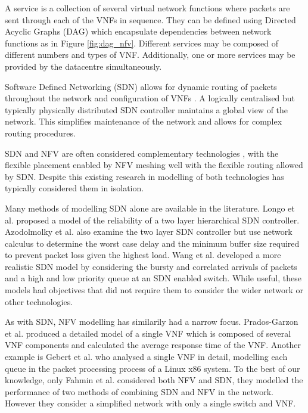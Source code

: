 A service is a collection of several virtual network functions where packets are sent through each of the VNFs in sequence. They can be defined using Directed Acyclic Graphs (DAG) which encapsulate dependencies between network functions as in Figure \ref{fig:dag_nfv}. Different services may be composed of different numbers and types of VNF. Additionally, one or more services may be provided by the datacentre simultaneously.

Software Defined Networking (SDN) allows for dynamic routing of packets throughout the network and configuration of VNFs \cite{KimF13, HaresW13}. A logically centralised but typically physically distributed SDN controller maintains a global view of the network. This simplifies maintenance of the network and allows for complex routing procedures. 

SDN and NFV are often considered complementary technologies \cite{MatiasGTUJ15}, with the flexible placement enabled by NFV meshing well with the flexible routing allowed by SDN. Despite this existing research in modelling of both technologies has typically considered them in isolation.

Many methods of modelling SDN alone are available in the literature. Longo et al. \cite{LongoDBS15} proposed a model of the reliability of a two layer hierarchical SDN controller. Azodolmolky et al. \cite{AzodolmolkyWY13} also examine the two layer SDN controller but use network calculus to determine the worst case delay and the minimum buffer size required to prevent packet loss given the highest load. Wang et al. \cite{MiaoMWWH16} developed a more realistic SDN model by considering the bursty and correlated arrivals of packets and a high and low priority queue at an SDN enabled switch. While useful, these models had objectives that did not require them to consider the wider network or other technologies.

As with SDN, NFV modelling has similarily had a narrow focus. Prados-Garzon et al. \cite{Prados-GarzonAR17} produced a detailed model of a single VNF which is composed of several VNF components and calculated the average response time of the VNF. Another example is Gebert et al. \cite{GebertZLST16} who analysed a single VNF in detail, modelling each queue in the packet processing process of a Linux x86 system. To the best of our knowledge, only Fahmin et al. \cite{FahminLHLS17} considered both NFV and SDN, they modelled the performance of two methods of combining SDN and NFV in the network. However they consider a simplified network with only a single switch and VNF.

